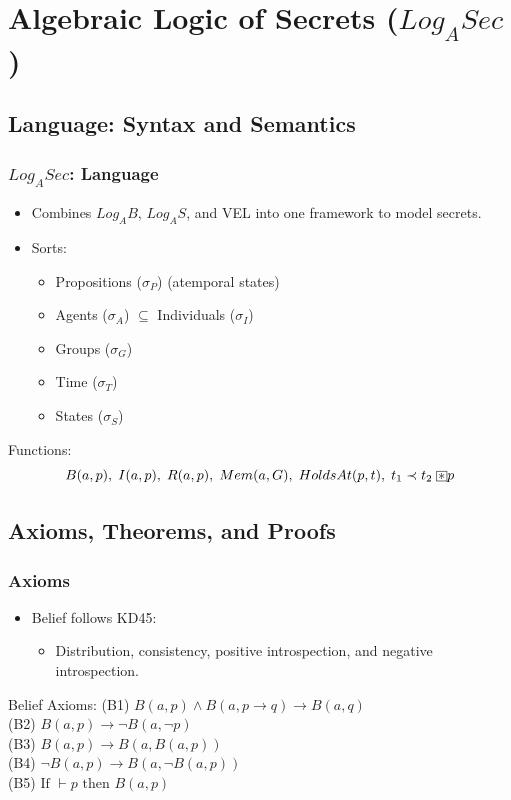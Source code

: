\documentclass[aspectratio=169]{beamer}
\newcommand{\BoxStar}{\fboxsep=1pt\fbox{$\ast$}}
\begin{document}
\section{Algebraic Logic of Secrets ($Log_ASec$)}

\subsection{Language: Syntax and Semantics}
\begin{frame}
\frametitle{$Log_ASec$: Language}
\begin{itemize}
    \item Combines $Log_AB$, $Log_AS$, and VEL into one framework to model secrets.
    \item Sorts:
    \begin{itemize}
        \item Propositions ($\sigma_P$) (atemporal states)
        \item Agents ($\sigma_A$) $\subseteq$ Individuals ($\sigma_I$)
        \item Groups ($\sigma_G$)
        \item Time ($\sigma_T$)
        \item States ($\sigma_S$)
    \end{itemize}
\end{itemize}
\begin{block}{Functions:}
\[
B(a, p), \; I(a, p), \; R(a, p), \;
Mem(a, G), \; HoldsAt(p, t), \; t_1 \prec t_2 \; \BoxStar p
\]
\end{block}
\end{frame}

\subsection{Axioms, Theorems, and Proofs}
\begin{frame}
\frametitle{Axioms}
\Large 
\begin{itemize}
    \item Belief follows KD45:
    \begin{itemize}
        \Large 
        \item Distribution, consistency, positive introspection, and negative introspection.
    \end{itemize}
\end{itemize}
\begin{block}{Belief Axioms:}
    \Large
    \normalfont
    (B1) $B(a, p) \wedge B(a, p \rightarrow q) \rightarrow B(a, q)$ \\
    (B2) $B(a, p) \rightarrow \neg B(a, \neg p)$ \\
    (B3) $B(a, p) \rightarrow B(a, B(a, p))$ \\
    (B4) $\neg B(a, p) \rightarrow B(a, \neg B(a, p))$ \\    
    (B5) $\text{If } \vdash p \text{ then } B(a, p)$
\end{block}
\end{frame}
\end{document}
